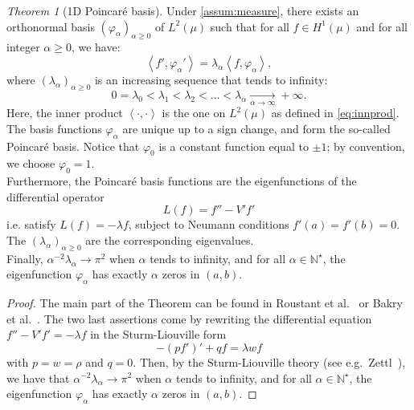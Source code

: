 \documentclass[a4paper,11pt]{article}
\newcommand{\innprod}[2]{\left\langle #1, #2 \right\rangle}
\renewcommand{\citet}[2][]{\cite[#1]{#2}}
\theoremstyle{definition}
\theoremstyle{remark}
\theoremstyle{theorem}
\newtheorem{thm}{Theorem}
\begin{document}
\begin{thm}[1D Poincar\'e basis]
	\label{thm:1DPoincare}
	Under \cref{assum:measure},  
	there exists an orthonormal basis $\left( \varphi_\alpha \right)_{\alpha \geq 0}$ of $L^2(\mu)$ such that for all $f \in H^1(\mu)$ and 
	for all integer $\alpha \geq 0$, we have: 
	\begin{equation} \label{eq:PoincareWeakForm1D}
	\innprod{ f'}{ \varphi_\alpha' } = \lambda_\alpha \innprod{ f}{ \varphi_\alpha },
	\end{equation}
	where $(\lambda_\alpha)_{\alpha \geq 0}$ is an increasing sequence that tends to infinity: 
	\begin{equation*}
	0 = \lambda_0 < \lambda_1 < \lambda_2 < \dots 
	< \lambda_\alpha \underset{\alpha \rightarrow \infty}{\longrightarrow} +\infty.
	\end{equation*}
	Here, the inner product $\innprod{\cdot}{\cdot}$ is the one on $L^2(\mu)$ as defined in \eqref{eq:innprod}. 
	The basis functions $\varphi_\alpha$ are unique up to a sign change, and form the so-called Poincar\'e basis. Notice that $\varphi_0$ is a constant function equal to $\pm 1$; by convention, we choose $\varphi_0 = 1$.\\
	Furthermore, the Poincar\'e basis functions are the eigenfunctions of the differential operator
	\begin{equation*}
	L(f) = f'' - V'f'
	\end{equation*}
	i.e. satisfy $L(f) = - \lambda f$, subject to Neumann conditions $f'(a) = f'(b) = 0$.
	The $(\lambda_\alpha)_{\alpha \geq 0}$ are the corresponding  eigenvalues. \\
	Finally, $\alpha^{-2} \lambda_\alpha \to \pi^2$ when $\alpha$ tends to infinity, and for all $\alpha \in \mathbb{N}^\star$, the eigenfunction $\varphi_\alpha$ has exactly $\alpha$ zeros in $(a, b)$.
\end{thm}

\begin{proof}
	The main part of the Theorem can be found in Roustant et al.~\cite{roubar17} or Bakry et al.~\cite{BGL_book}. 
	The two last assertions come by rewriting the differential equation $f'' - V'f' = - \lambda f$ in the Sturm-Liouville form
	\begin{equation}
	-(pf')' + qf = \lambda w f
	\label{eq:sturm-liouville}
	\end{equation}
	with $p =w = \rho$ and $q = 0$. Then, by the Sturm-Liouville theory (see e.g.\ Zettl~\citet[Theorem 4.3.1, (1), (6) and (7)]{zettl2010sturm}), we have that $\alpha^{-2} \lambda_\alpha \to \pi^2$ when $\alpha$ tends to infinity, and for all $\alpha \in \mathbb{N}^\star$, the eigenfunction $\varphi_\alpha$ has exactly $\alpha$ zeros in $(a, b)$.
\end{proof}
\end{document}
